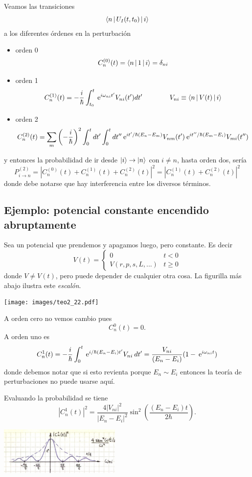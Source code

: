 \documentclass[10pt,oneside]{CBFT_book}
\begin{document}
Veamos las transiciones 
\[
	\Braket{ n | U_I(t,t_0)| i }
\]
a los diferentes órdenes en la perturbación
\begin{itemize}
 \item orden 0
 \[
	C_n^{(0)}(t) = \Braket{n|1|i} = \delta_{ni}
 \]
 \item orden 1
 \[
 	C_n^{(1)}(t) = -\frac{i}{\hbar} \int_{t_0}^t \:\mathrm{e}^{i\omega_{ni} t'} V_{ni}(t') dt' \qquad \qquad 
 	V_{ni} \equiv \Braket{n|V(t)|i}
 \]
 \item orden 2
 \[
 	C_n^{(2)}(t) = \sum_m \left( -\frac{i}{\hbar} \right)^2  \int_{0}^t  dt'\int_{0}^t dt''
 	\:\mathrm{e}^{it'/\hbar(E_n-E_m)} V_{nm}(t') \:\mathrm{e}^{it''/\hbar(E_m-E_i)} V_{mi}(t'')
 \]
\end{itemize}
y entonces la probabilidad de ir desde $\ket{i} \to \Ket{n}$ con $i\neq n$, hasta orden dos, sería
\[
	P^{(2)}_{i\to n} = |C_n^{(0)}(t)+C_n^{(1)}(t)+C_n^{(2)}(t)|^2 =
	| C_n^{(1)}(t) + C_n^{(2)}(t) |^2
\]
donde debe notarse que hay interferencia entre los diversos términos.

\subsection{Ejemplo: potencial constante encendido abruptamente}

Sea un potencial que prendemos y apagamos luego, pero constante. Es decir
\[
	V(t) = \begin{cases}
	0 	& t < 0  \\
	V(r,p,s,L,...) & t \geq 0
	\end{cases}
\]
donde $V \neq V(t)$, pero puede depender de cualquier otra cosa. La figurilla más abajo
ilustra este {\it escalón}.

\texttt{[image: images/teo2\_22.pdf]}

A orden cero no vemos cambio pues
\[
	C^0_n(t) = 0.
\]
A orden uno es 
\[
	C^1_n(t) = -\frac{i}{\hbar} \int_0^t \:\mathrm{e}^{i/\hbar(E_n - E_i)t'} V_{ni} \: dt'=
	\frac{V_{ni}}{(E_n - E_i)}(1-\:\mathrm{e}^{i\omega_{ni}t})
\]
donde debemos notar que si esto revienta porque $E_n \sim E_i$ entonces la teoría de
perturbaciones no puede usarse aquí.

Evaluando la probabilidad se tiene	
\[
	|C^1_n(t)|^2 = 
	\frac{4|V_{ni}|^2}{| E_n - E_i|^2}\sin^2\left(\frac{(E_n - E_i)t}{2\hbar}\right).
\]

	\includegraphics[width=0.45\textwidth]{images/fig_ft2_potencial_abrupto.jpg}
\end{document}
